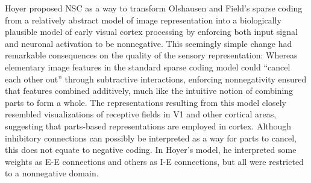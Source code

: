 Hoyer \citep{Hoyer2002,Hoyer2003} proposed \ac{NSC} as a way 
to transform Olshausen and Field's sparse coding 
from a relatively abstract model of image representation 
into a biologically plausible model of early visual cortex processing
by enforcing both input signal and neuronal activation to be nonnegative.
This seemingly simple change had remarkable consequences on the quality of the
sensory representation:
Whereas elementary image features in the standard sparse coding model could
``cancel each other out'' through subtractive interactions,
enforcing nonnegativity ensured that features combined additively,
much like the intuitive notion of combining parts to form a whole. The representations resulting from this model closely resembled visualizations of receptive fields in V1 and other cortical areas, suggesting that parts-based representations are employed in cortex. Although inhibitory connections can possibly be interpreted as a way for parts to cancel, this does not equate to negative coding. In Hoyer's model, he interpreted some weights as E-E connections and others as I-E connections, but all were restricted to a nonnegative domain. 

